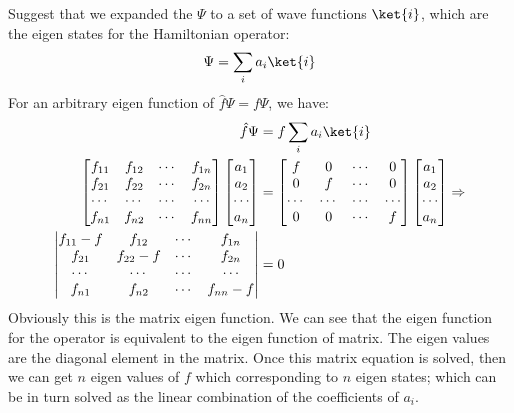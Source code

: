 Suggest that we expanded the $\Psi$ to a set of wave functions
$\ket{i}$, which are the eigen states for the Hamiltonian operator:
\begin{equation}\label{}
\Psi = \sum_{i}a_{i}\ket{i}
\end{equation}
For an arbitrary eigen function of $\hat{f}\Psi = f\Psi$, we have:
\begin{align}\label{REPRESENTATIONeq:8}
\hat{f}\Psi &= f\sum_{i}a_{i}\ket{i} \nonumber \\
\begin{bmatrix}
     f_{11} & f_{12} & \cdots & f_{1n} \\
     f_{21} & f_{22} & \cdots & f_{2n} \\
     \cdots & \cdots & \cdots & \cdots \\
     f_{n1} & f_{n2} & \cdots & f_{nn} \\
   \end{bmatrix}
\begin{bmatrix}
  a_{1} \\
  a_{2} \\
  \cdots \\
  a_{n} \\
\end{bmatrix}
&= \begin{bmatrix}
     f & 0 & \cdots & 0 \\
     0 & f & \cdots & 0 \\
     \cdots & \cdots & \cdots & \cdots \\
     0 & 0 & \cdots & f \\
   \end{bmatrix}
\begin{bmatrix}
  a_{1} \\
  a_{2} \\
  \cdots \\
  a_{n} \\
\end{bmatrix} \Rightarrow \nonumber \\
\begin{vmatrix}
     f_{11} -f & f_{12} & \cdots & f_{1n} \\
     f_{21} & f_{22} -f & \cdots & f_{2n} \\
     \cdots & \cdots & \cdots & \cdots \\
     f_{n1} & f_{n2} & \cdots & f_{nn} -f \\
   \end{vmatrix}
&= 0
\end{align}
Obviously this is the matrix eigen function. We can see that the
eigen function for the operator is equivalent to the eigen function
of matrix. The eigen values are the diagonal element in the matrix.
Once this matrix equation is solved, then we can get $n$ eigen
values of $f$ which corresponding to $n$ eigen states; which can be
in turn solved as the linear combination of the coefficients of
$a_{i}$.


